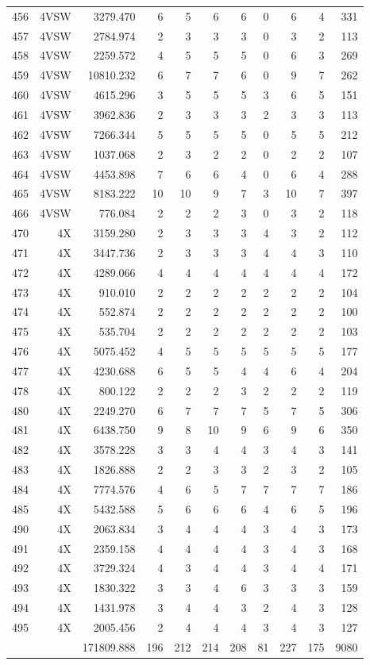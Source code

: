 \documentclass[12pt]{article}\usepackage[]{graphicx}\usepackage[]{color}
\begin{document}
\begin{landscapepage}
\begin{longtable}[t]{crrrrrrrrrr}
456 & 4VSW & 3279.470 & 6 & 5 & 6 & 6 & 0 & 6 & 4 & 331\\
457 & 4VSW & 2784.974 & 2 & 3 & 3 & 3 & 0 & 3 & 2 & 113\\
458 & 4VSW & 2259.572 & 4 & 5 & 5 & 5 & 0 & 6 & 3 & 269\\
459 & 4VSW & 10810.232 & 6 & 7 & 7 & 6 & 0 & 9 & 7 & 262\\
460 & 4VSW & 4615.296 & 3 & 5 & 5 & 5 & 3 & 6 & 5 & 151\\
461 & 4VSW & 3962.836 & 2 & 3 & 3 & 3 & 2 & 3 & 3 & 113\\
462 & 4VSW & 7266.344 & 5 & 5 & 5 & 5 & 0 & 5 & 5 & 212\\
463 & 4VSW & 1037.068 & 2 & 3 & 2 & 2 & 0 & 2 & 2 & 107\\
464 & 4VSW & 4453.898 & 7 & 6 & 6 & 4 & 0 & 6 & 4 & 288\\
465 & 4VSW & 8183.222 & 10 & 10 & 9 & 7 & 3 & 10 & 7 & 397\\
466 & 4VSW & 776.084 & 2 & 2 & 2 & 3 & 0 & 3 & 2 & 118\\
470 & 4X & 3159.280 & 2 & 3 & 3 & 3 & 4 & 3 & 2 & 112\\
471 & 4X & 3447.736 & 2 & 3 & 3 & 3 & 4 & 4 & 3 & 110\\
472 & 4X & 4289.066 & 4 & 4 & 4 & 4 & 4 & 4 & 4 & 172\\
473 & 4X & 910.010 & 2 & 2 & 2 & 2 & 2 & 2 & 2 & 104\\
474 & 4X & 552.874 & 2 & 2 & 2 & 2 & 2 & 2 & 2 & 100\\
475 & 4X & 535.704 & 2 & 2 & 2 & 2 & 2 & 2 & 2 & 103\\
476 & 4X & 5075.452 & 4 & 5 & 5 & 5 & 5 & 5 & 5 & 177\\
477 & 4X & 4230.688 & 6 & 5 & 5 & 4 & 4 & 6 & 4 & 204\\
478 & 4X & 800.122 & 2 & 2 & 2 & 3 & 2 & 2 & 2 & 119\\
480 & 4X & 2249.270 & 6 & 7 & 7 & 7 & 5 & 7 & 5 & 306\\
481 & 4X & 6438.750 & 9 & 8 & 10 & 9 & 6 & 9 & 6 & 350\\
482 & 4X & 3578.228 & 3 & 3 & 4 & 4 & 3 & 4 & 3 & 141\\
483 & 4X & 1826.888 & 2 & 2 & 3 & 3 & 2 & 3 & 2 & 105\\
484 & 4X & 7774.576 & 4 & 6 & 5 & 7 & 7 & 7 & 7 & 186\\
485 & 4X & 5432.588 & 5 & 6 & 6 & 6 & 4 & 6 & 5 & 196\\
490 & 4X & 2063.834 & 3 & 4 & 4 & 4 & 3 & 4 & 3 & 173\\
491 & 4X & 2359.158 & 4 & 4 & 4 & 4 & 3 & 4 & 3 & 168\\
492 & 4X & 3729.324 & 4 & 3 & 4 & 4 & 3 & 4 & 4 & 171\\
493 & 4X & 1830.322 & 3 & 3 & 4 & 6 & 3 & 3 & 3 & 159\\
494 & 4X & 1431.978 & 3 & 4 & 4 & 3 & 2 & 4 & 3 & 128\\
495 & 4X & 2005.456 & 2 & 4 & 4 & 4 & 3 & 4 & 3 & 127\\
 &  & 171809.888 & 196 & 212 & 214 & 208 & 81 & 227 & 175 & 9080\\*
\end{longtable}
\endgroup{}
\end{landscapepage}
\end{document}
